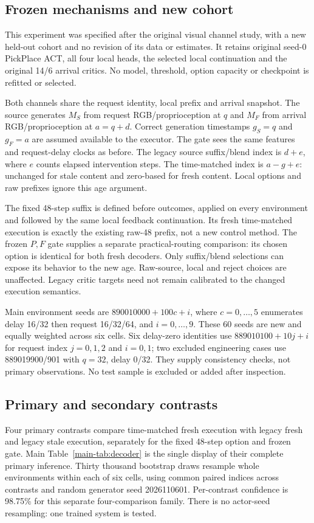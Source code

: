 \subsection{Frozen mechanisms and new cohort}
This experiment was specified after the original visual channel study, with a new held-out cohort and no revision of its data or estimates. It retains original seed-0 PickPlace ACT, all four local heads, the selected local continuation and the original 14/6 arrival critics. No model, threshold, option capacity or checkpoint is refitted or selected.

Both channels share the request identity, local prefix and arrival snapshot. The source generates $M_S$ from request RGB/proprioception at $q$ and $M_F$ from arrival RGB/proprioception at $a=q+d$. Correct generation timestamps $g_S=q$ and $g_F=a$ are assumed available to the executor. The gate sees the same features and request-delay clocks as before. The legacy source suffix/blend index is $d+e$, where $e$ counts elapsed intervention steps. The time-matched index is $a-g+e$: unchanged for stale content and zero-based for fresh content. Local options and raw prefixes ignore this age argument.

The fixed 48-step suffix is defined before outcomes, applied on every environment and followed by the same local feedback continuation. Its fresh time-matched execution is exactly the existing raw-48 prefix, not a new control method. The frozen $P,F$ gate supplies a separate practical-routing comparison: its chosen option is identical for both fresh decoders. Only suffix/blend selections can expose its behavior to the new age. Raw-source, local and reject choices are unaffected. Legacy critic targets need not remain calibrated to the changed execution semantics.

Main environment seeds are $890010000+100c+i$, where $c=0,\ldots,5$ enumerates delay 16/32 then request 16/32/64, and $i=0,\ldots,9$. These 60 seeds are new and equally weighted across six cells. Six delay-zero identities use $889010100+10j+i$ for request index $j=0,1,2$ and $i=0,1$; two excluded engineering cases use 889019900/901 with $q=32$, delay 0/32. They supply consistency checks, not primary observations. No test sample is excluded or added after inspection.

\subsection{Primary and secondary contrasts}
Four primary contrasts compare time-matched fresh execution with legacy fresh and legacy stale execution, separately for the fixed 48-step option and frozen gate. Main Table~\ref{main-tab:decoder} is the single display of their complete primary inference. Thirty thousand bootstrap draws resample whole environments within each of six cells, using common paired indices across contrasts and random generator seed 2026110601. Per-contrast confidence is 98.75\% for this separate four-comparison family. There is no actor-seed resampling: one trained system is tested.

